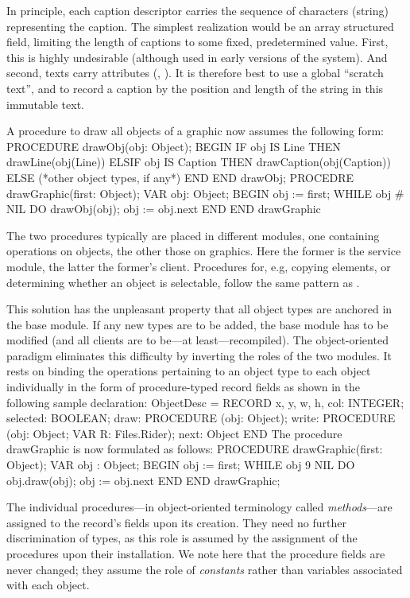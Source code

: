 In principle, each caption descriptor carries the sequence of characters (string) representing the caption. The simplest realization would be an array structured field, limiting the length of captions to some fixed, predetermined value. First, this is highly undesirable (although used in early versions of the system). And second, texts carry attributes (, ). It is therefore best to use a global ``scratch text'', and to record a caption by the position and length of the string in this immutable text.

A procedure  to draw all objects of a graphic now assumes the following form:
\begintt
PROCEDURE drawObj(obj: Object); BEGIN
IF obj IS Line THEN drawLine(obj(Line))
ELSIF obj IS Caption THEN drawCaption(obj(Caption)) ELSE (*other object types, if any*)
END
END drawObj;
PROCEDRE drawGraphic(first: Object); VAR obj: Object;
BEGIN obj := first;
WHILE obj # NIL DO drawObj(obj); obj := obj.next END
END drawGraphic
\endtt

\noindent The two procedures typically are placed in different modules, one containing operations on objects, the other those on graphics. Here the former is the service module, the latter the former's client. Procedures for, e.g, copying elements, or determining whether an object is selectable, follow the same pattern as .

This solution has the unpleasant property that all object types are anchored in the base module. If any new types are to be added, the base module has to be modified (and all clients are to be---at least---recompiled). The object-oriented paradigm eliminates this difficulty by inverting the roles of the two modules. It rests on binding the operations pertaining to an object type to each object individually in the form of procedure-typed record fields as shown in the following sample declaration:
\begintt
ObjectDesc =
RECORD
x, y, w, h, col: INTEGER; selected: BOOLEAN;
draw: PROCEDURE (obj: Object);
write: PROCEDURE (obj: Object; VAR R: Files.Rider); next: Object
END
\endtt
The procedure drawGraphic is now formulated as follows:
\begintt
PROCEDURE drawGraphic(first: Object); VAR obj : Object;
BEGIN obj := first;
WHILE obj 9 NIL DO obj.draw(obj); obj := obj.next END
END drawGraphic;
\endtt

The individual procedures---in object-oriented terminology called \emph{methods}---are assigned to the record's fields upon its creation. They need no further discrimination of types, as this role is assumed by the assignment of the procedures upon their installation. We note here that the procedure fields are never changed; they assume the role of \emph{constants} rather than variables associated with each object.

